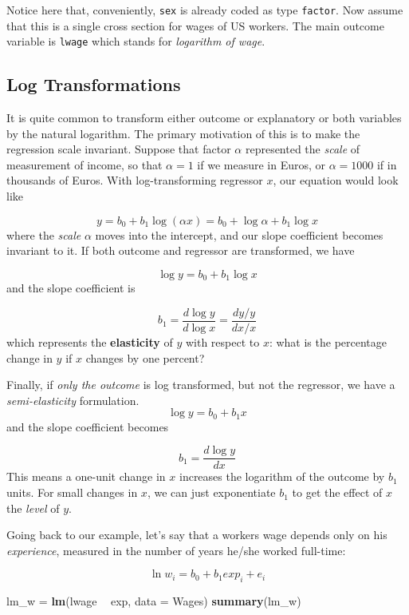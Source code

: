 \documentclass[]{book}
\newenvironment{Shaded}{\begin{snugshade}}{\end{snugshade}}
\newcommand{\KeywordTok}[1]{\textcolor[rgb]{0.13,0.29,0.53}{\textbf{#1}}}
\newcommand{\DataTypeTok}[1]{\textcolor[rgb]{0.13,0.29,0.53}{#1}}
\newcommand{\StringTok}[1]{\textcolor[rgb]{0.31,0.60,0.02}{#1}}
\newcommand{\OperatorTok}[1]{\textcolor[rgb]{0.81,0.36,0.00}{\textbf{#1}}}
\newcommand{\NormalTok}[1]{#1}
\begin{document}
Notice here that, conveniently, \texttt{sex} is already coded as type
\texttt{factor}. Now assume that this is a single cross section for
wages of US workers. The main outcome variable is \texttt{lwage} which
stands for \emph{logarithm of wage}.

\subsection{Log Transformations}\label{log-transformations}

It is quite common to transform either outcome or explanatory or both
variables by the natural logarithm. The primary motivation of this is to
make the regression scale invariant. Suppose that factor \(\alpha\)
represented the \emph{scale} of measurement of income, so that
\(\alpha=1\) if we measure in Euros, or \(\alpha=1000\) if in thousands
of Euros. With log-transforming regressor \(x\), our equation would look
like

\[
y = b_0 + b_1 \log(\alpha x) = b_0 + \log \alpha  + b_1 \log x 
\] where the \emph{scale} \(\alpha\) moves into the intercept, and our
slope coefficient becomes invariant to it. If both outcome and regressor
are transformed, we have

\[
\log y = b_0 + b_1 \log x
\] and the slope coefficient is

\[
b_1 = \frac{d\log y}{d \log x} = \frac{dy/y}{dx/x}
\] which represents the \textbf{elasticity} of \(y\) with respect to
\(x\): what is the percentage change in \(y\) if \(x\) changes by one
percent?

Finally, if \emph{only the outcome} is log transformed, but not the
regressor, we have a \emph{semi-elasticity} formulation. \[
\log y = b_0 + b_1 x
\] and the slope coefficient becomes

\[
b_1 = \frac{d\log y}{d x}
\] This means a one-unit change in \(x\) increases the logarithm of the
outcome by \(b_1\) units. For small changes in \(x\), we can just
exponentiate \(b_1\) to get the effect of \(x\) the \emph{level} of
\(y\).

Going back to our example, let's say that a workers wage depends only on
his \emph{experience}, measured in the number of years he/she worked
full-time:

\begin{equation}
\ln w_i = b_0 + b_1 exp_i + e_i \label{eq:wage-exp}
\end{equation}

\begin{Shaded}
\begin{Highlighting}[]
\NormalTok{lm_w =}\StringTok{ }\KeywordTok{lm}\NormalTok{(lwage }\OperatorTok{~}\StringTok{ }\NormalTok{exp, }\DataTypeTok{data =}\NormalTok{ Wages)}
\KeywordTok{summary}\NormalTok{(lm_w)}
\end{Highlighting}
\end{Shaded}
\end{document}
